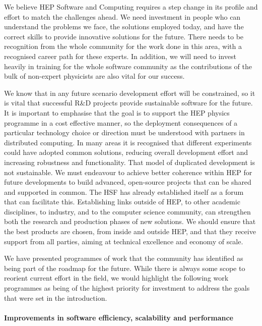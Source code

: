 We believe HEP Software and Computing requires a step change in its profile and
effort to match the challenges ahead. We need investment in people who
can understand the problems we face, the solutions employed today, and
have the correct skills to provide innovative solutions for the future.
There needs to be recognition from the whole community for the work done
in this area, with a recognised career path for these experts. In
addition, we will need to invest heavily in training for the whole
software community as the contributions of the bulk of non-expert
physicists are also vital for our success.

We know that in any future scenario development effort will be
constrained, so it is vital that successful R\&D projects provide
sustainable software for the future. It is important to emphasise that the goal
is to support the HEP physics programme in a cost effective manner, so the
deployment consequences of a particular technology choice or direction must be
understood with partners in distributed computing. In many areas it is recognised
that different experiments could have adopted common solutions,
reducing overall development effort and increasing robustness and
functionality. That model of duplicated development is not sustainable. We must
endeavour to achieve better coherence within HEP for future developments
to build advanced, open-source projects that can be shared and supported
in common. The HSF has already established itself as a forum that can
facilitate this. Establishing links outside of HEP, to other academic
disciplines, to industry, and to the computer science community, can
strengthen both the research and production phases of new solutions. We
should ensure that the best products are chosen, from inside and outside
HEP, and that they receive support from all parties, aiming at technical
excellence and economy of scale.

We have presented programmes of work that the community has identified
as being part of the roadmap for the future. While there is always some
scope to reorient current effort in the field, we would highlight the
following work programmes as being of the highest priority for
investment to address the goals that were set in the introduction.

\paragraph{Improvements in software efficiency, scalability and performance}

